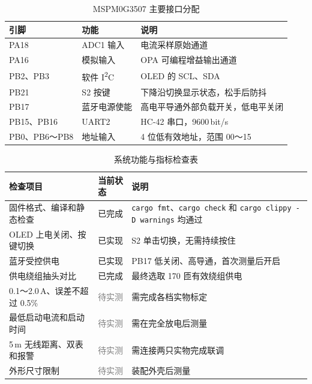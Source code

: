 \documentclass[12pt,a4paper]{article}
\newcommand{\wuhao}{\fontsize{10.5bp}{15bp}\selectfont}
\newcommand{\placeholder}{\textcolor{gray}{待实测}}
\begin{document}
\begin{table}[H]
\centering
\caption{MSPM0G3507 主要接口分配}
\label{tab:pins_v2}
\wuhao
\begin{tabularx}{\textwidth}{|>{\centering\arraybackslash}p{25mm}|
>{\centering\arraybackslash}p{30mm}|X|}
\hline
引脚 & 功能 & 说明\\ \hline
PA18 & ADC1 输入 & 电流采样原始通道\\ \hline
PA16 & 模拟输入 & OPA 可编程增益输出通道\\ \hline
PB2、PB3 & 软件 I\textsuperscript{2}C & OLED 的 SCL、SDA\\ \hline
PB21 & S2 按键 & 下降沿切换显示状态，松手后防抖\\ \hline
PB17 & 蓝牙电源使能 & 高电平导通外部负载开关，低电平关闭\\ \hline
PB15、PB16 & UART2 & HC-42 串口，9600\,bit/s\\ \hline
PB0、PB6～PB8 & 地址输入 & 4 位低有效地址，范围 00～15\\ \hline
\end{tabularx}
\end{table}

\begin{table}[H]
\centering
\caption{系统功能与指标检查表}
\label{tab:check_v2}
\wuhao
\begin{tabularx}{\textwidth}{|p{40mm}|>{\centering\arraybackslash}p{22mm}|
>{\raggedright\arraybackslash}X|}
\hline
检查项目 & 当前状态 & 说明\\ \hline
固件格式、编译和静态检查 & 已完成 & \texttt{cargo fmt}、\texttt{cargo check} 和
\texttt{cargo clippy -D warnings} 均通过\\ \hline
OLED 上电关闭、按键切换 & 已实现 & S2 单击切换，无需持续按住\\ \hline
蓝牙受控供电 & 已实现 & PB17 低关闭、高导通，首次测量后开启\\ \hline
供电绕组抽头对比 & 已完成 & 最终选取 170 匝有效绕组供电\\ \hline
0.1～2.0\,A、误差不超过 0.5\% & \placeholder & 需完成各档实物标定\\ \hline
最低启动电流和启动时间 & \placeholder & 需在完全放电后测量\\ \hline
5\,m 无线距离、双表和报警 & \placeholder & 需连接两只实物完成联调\\ \hline
外形尺寸限制 & \placeholder & 装配外壳后测量\\ \hline
\end{tabularx}
\end{table}
\end{document}

